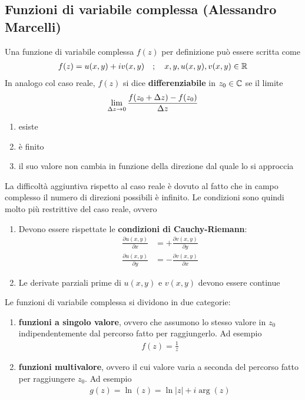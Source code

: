\subsection{Funzioni di variabile complessa (Alessandro Marcelli)}

Una funzione di variabile complessa $f(z)$ per definizione può essere scritta come
\begin{align}
	f(z) = u(x,y) + i v(x,y) \quad ; \quad x,y, u(x,y), v(x,y) \in \mathbb{R}
\end{align}
In analogo col caso reale, $f(z)$ si dice \textbf{differenziabile}\cite{MfP} in $z_0 \in \mathbb{C}$ se il limite
\begin{align}
	\underset{\Delta z \rightarrow 0}{\lim} \, \frac{f(z_0 + \Delta z) - f(z_0)}{\Delta z}
\end{align}
\begin{enumerate}
	\item esiste
	\item è finito
	\item il suo valore non cambia in funzione della direzione dal quale lo si approccia
\end{enumerate}
La difficoltà aggiuntiva rispetto al caso reale è dovuto al fatto che in campo complesso il numero di direzioni possibili è infinito. Le condizioni sono quindi molto più restrittive del caso reale, ovvero
\begin{enumerate}
	\item Devono essere rispettate le \textbf{condizioni di Cauchy-Riemann}:
	\begin{align}
		\frac{\partial u(x,y)}{\partial x} &= +\frac{\partial v(x,y)}{\partial y}\\
		\frac{\partial u(x,y)}{\partial y} &= -\frac{\partial v(x,y)}{\partial x}		
	\end{align}
	\item Le derivate parziali prime di $u(x,y)$ e $v(x,y)$ devono essere continue
\end{enumerate}

Le funzioni di variabile complessa si dividono in due categorie:
\begin{enumerate}
	\item \textbf{funzioni a singolo valore}, ovvero che assumono lo stesso valore in $z_0$ indipendentemente dal percorso fatto per raggiungerlo. Ad esempio
	\begin{align}
		f(z) = \frac{1}{z}
	\end{align}
	\item \textbf{funzioni multivalore}, ovvero il cui valore varia a seconda del percorso fatto per raggiungere $z_0$. Ad esempio
	\begin{align}
		g(z) = \ln(z) = \ln |z| + i \arg (z)
	\end{align}
\end{enumerate}

